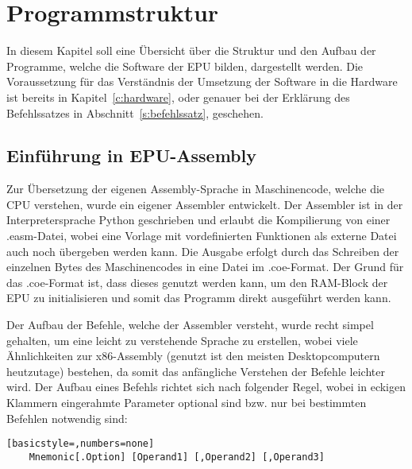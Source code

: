 \chapter{Programmstruktur}
In diesem Kapitel soll eine Übersicht über die Struktur und den Aufbau der
Programme, welche die Software der EPU bilden, dargestellt werden. Die
Voraussetzung für das Verständnis der Umsetzung der Software in die Hardware
ist bereits in Kapitel~\ref{c:hardware}, oder genauer bei der Erklärung des
Befehlssatzes in Abschnitt~\ref{s:befehlssatz}, geschehen.
\section{Einführung in EPU-Assembly}
Zur Übersetzung der eigenen Assembly-Sprache in Maschinencode, welche die CPU
verstehen, wurde ein eigener Assembler entwickelt. Der Assembler ist in  der
Interpretersprache Python geschrieben und erlaubt die Kompilierung von einer
.easm-Datei, wobei eine Vorlage mit vordefinierten Funktionen als externe Datei
auch noch übergeben werden kann. Die Ausgabe erfolgt durch das Schreiben der
einzelnen Bytes des Maschinencodes in eine Datei im .coe-Format. Der Grund für
das .coe-Format ist, dass dieses genutzt werden kann, um den RAM-Block der EPU
zu initialisieren und somit das Programm direkt ausgeführt werden kann.

Der Aufbau der Befehle, welche der Assembler versteht, wurde recht simpel
gehalten, um eine leicht zu verstehende Sprache zu erstellen, wobei viele
Ähnlichkeiten zur x86-Assembly (genutzt ist den meisten Desktopcomputern
heutzutage) bestehen, da somit das anfängliche Verstehen der Befehle leichter
wird. Der Aufbau eines Befehls richtet sich nach folgender Regel, wobei in
eckigen Klammern eingerahmte Parameter optional sind bzw. nur bei bestimmten
Befehlen notwendig sind:
\begin{lstlisting}[basicstyle=,numbers=none]
	Mnemonic[.Option] [Operand1] [,Operand2] [,Operand3]
\end{lstlisting}

